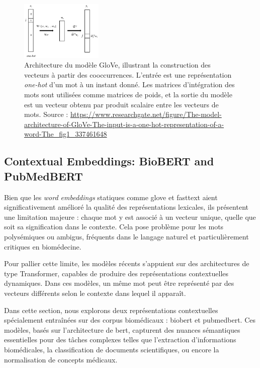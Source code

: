 \documentclass[12pt]{report}
\begin{document}
\begin{figure}[H]
    \centering
    \includegraphics[width=0.35\textwidth]{glove.png}
    \caption{Architecture du modèle GloVe, illustrant la construction des vecteurs à partir des cooccurrences. L'entrée est une représentation \textit{one-hot} d’un mot à un instant donné. Les matrices d'intégration des mots sont utilisées comme matrices de poids, et la sortie du modèle est un vecteur obtenu par produit scalaire entre les vecteurs de mots. Source : \url{https://www.researchgate.net/figure/The-model-architecture-of-GloVe-The-input-is-a-one-hot-representation-of-a-word-The_fig1_337461648}}
    \label{fig:glove_architecture}
\end{figure}

\subsection{Contextual Embeddings: BioBERT and PubMedBERT}

Bien que les \textit{word embeddings} statiques comme \gls{glove} et \gls{fasttext} aient significativement amélioré la qualité des représentations lexicales, ils présentent une limitation majeure : chaque mot y est associé à un vecteur unique, quelle que soit sa signification dans le contexte. Cela pose problème pour les mots polysémiques ou ambigus, fréquents dans le langage naturel et particulièrement critiques en biomédecine.

Pour pallier cette limite, les modèles récents s'appuient sur des architectures de type Transformer, capables de produire des représentations contextuelles dynamiques. Dans ces modèles, un même mot peut être représenté par des vecteurs différents selon le contexte dans lequel il apparaît.

Dans cette section, nous explorons deux représentations contextuelles spécialement entraînées sur des corpus biomédicaux : \gls{biobert} et \gls{pubmedbert}. Ces modèles, basés sur l’architecture de \gls{bert}, capturent des nuances sémantiques essentielles pour des tâches complexes telles que l’extraction d’informations biomédicales, la classification de documents scientifiques, ou encore la normalisation de concepts médicaux.
\end{document}
